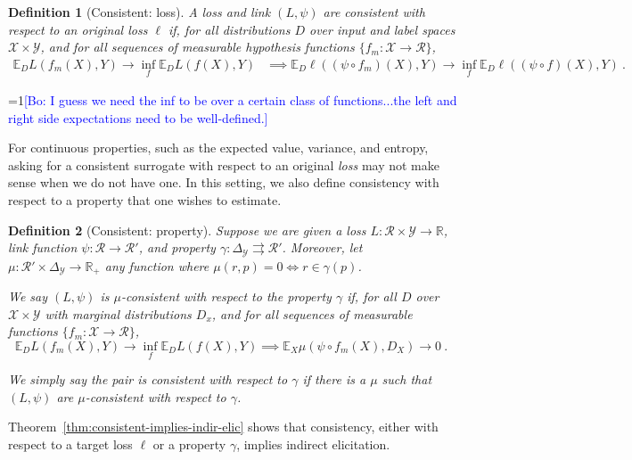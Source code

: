 \documentclass{article}
\newcommand{\Comments}{1}
\newcommand{\mynote}[2]{\ifnum\Comments=1\textcolor{#1}{#2}\fi}
\newcommand{\bo}[1]{\mynote{blue}{[Bo: #1]}}
\newcommand{\reals}{\mathbb{R}}
\newcommand{\simplex}{\Delta_\Y}
\newcommand{\propdis}{\mu}
\newcommand{\E}{\mathbb{E}}
\newcommand{\R}{\mathcal{R}}
\newcommand{\X}{\mathcal{X}}
\newcommand{\Y}{\mathcal{Y}}
\newcommand{\toto}{\rightrightarrows}
\newtheorem{definition}{Definition}
\begin{document}
\begin{definition}[Consistent: loss]\label{def:consistent-ell}
	A loss and link $(L,\psi)$ are consistent with respect to an original loss $\ell$ if, for all distributions $D$ over input and label spaces $\X \times\Y$, and for all sequences of measurable hypothesis functions $\{f_m : \X \to \R\}$,
	\begin{align*}
	\E_D L(f_m(X), Y) \to \inf_f \E_D L(f(X), Y) &\implies \E_D \ell((\psi \circ f_m)(X), Y) \to \inf_f \E_D \ell((\psi \circ f)(X), Y)~.~
	\end{align*}
\end{definition}
\bo{I guess we need the inf to be over a certain class of functions...the left and right side expectations need to be well-defined.}

For continuous properties, such as the expected value, variance, and entropy, asking for a consistent surrogate with respect to an original \emph{loss} may not make sense when we do not have one.
In this setting, we also define consistency with respect to a property that one wishes to estimate. 

\begin{definition}[Consistent: property]\label{def:consistent-prop}
	Suppose we are given a loss $L : \R \times \Y \to \reals$, link function $\psi: \R \to \R'$, and property $\gamma:\simplex \toto \R'$.
	Moreover, let $\propdis : \R' \times \simplex \to \reals_+$ any function where $\propdis(r,p) = 0 \iff r \in \gamma(p)$.
	
	We say $(L, \psi)$ is \emph{$\mu$-consistent with respect to the property} $\gamma$ if, for all $D$ over $\X \times \Y$ with marginal distributions $D_x$, and for all sequences of measurable functions $\{f_m: \X \to \R\}$, 
	\begin{equation}
	\E_{D} L(f_m(X), Y) \to \inf_f \E_{D} L( f(X), Y) \implies \E_X \propdis(\psi \circ f_m(X), D_X) \to 0~.~
	\end{equation}
	
	We simply say the pair is consistent with respect to $\gamma$ if there is a $\propdis$ such that $(L,\psi)$ are $\propdis$-consistent with respect to $\gamma$.
\end{definition}

Theorem~\ref{thm:consistent-implies-indir-elic} shows that consistency, either with respect to a target loss $\ell$ or a property $\gamma$, implies indirect elicitation.
\end{document}
